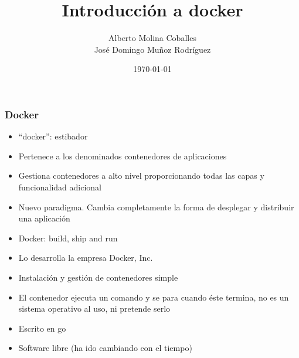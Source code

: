 \documentclass[aspectratio=169]{beamer}
\author{Alberto Molina Coballes\\
José Domingo Muñoz Rodríguez}
\title{Introducción a docker}
\institute{IES Gonzalo Nazareno}
\date{\today}
\begin{document}
\begin{frame}[t,plain]
\titlepage
\end{frame}

\begin{frame}
  \frametitle{Docker}
  \begin{itemize}
  \item “docker”: estibador
  \item Pertenece a los denominados contenedores de aplicaciones
  \item Gestiona contenedores a alto nivel proporcionando todas las capas y funcionalidad adicional
  \item Nuevo paradigma. Cambia completamente la forma de desplegar y distribuir una aplicación
  \item Docker: build, ship and run
  \item Lo desarrolla la empresa Docker, Inc.
  \item Instalación y gestión de contenedores simple
  \item El contenedor ejecuta un comando y se para cuando éste termina, no es un sistema operativo al uso, ni pretende serlo
  \item Escrito en go
  \item Software libre (ha ido cambiando con el tiempo)
  \end{itemize}
\end{frame}
\end{document}
